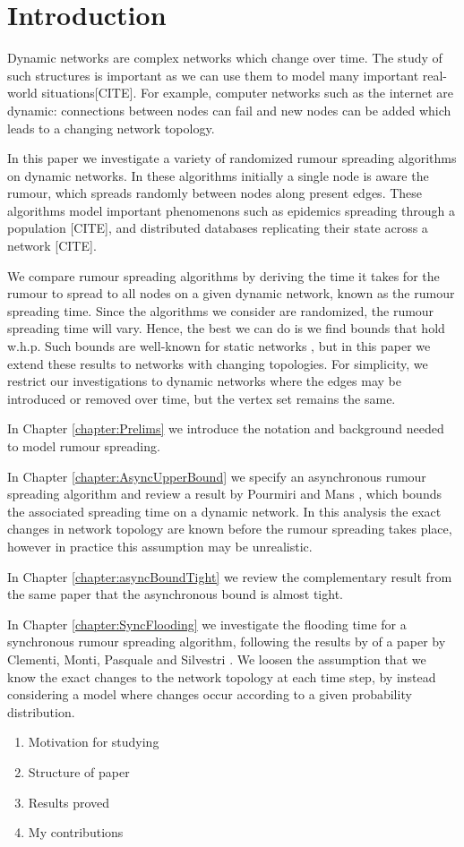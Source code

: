 \chapter{Introduction}

Dynamic networks are complex networks which change over time. The study of such structures is important as we can use them to model many important real-world situations[CITE]. For example, computer networks such as the internet are dynamic: connections between nodes can fail and new nodes can be added which leads to a changing network topology. 

In this paper we investigate a variety of randomized rumour spreading algorithms on dynamic networks. In these algorithms initially a single node is aware the rumour, which spreads randomly between nodes along present edges. These algorithms model important phenomenons such as epidemics spreading through a population [CITE], and distributed databases replicating their state across a network [CITE]. 

We compare rumour spreading algorithms by deriving the time it takes for the rumour to spread to all nodes on a given dynamic network, known as the rumour spreading time. Since the algorithms we consider are randomized, the rumour spreading time will vary. Hence, the best we can do is we find bounds that hold w.h.p. Such bounds are well-known for static networks \cite{complexNetworksRumourSpreading}, but in this paper we extend these results to networks with changing topologies. For simplicity, we restrict our investigations to dynamic networks where the edges may be introduced or removed over time, but the vertex set remains the same.

In Chapter \ref{chapter:Prelims} we introduce the notation and background needed to model rumour spreading.

In Chapter \ref{chapter:AsyncUpperBound} we specify an asynchronous rumour spreading algorithm and review a result by Pourmiri and Mans \cite{asyncPaper}, which bounds the associated spreading time on a dynamic network. In this analysis the exact changes in network topology are known before the rumour spreading takes place, however in practice this assumption may be unrealistic.

In Chapter \ref{chapter:asyncBoundTight} we review the complementary result from the same paper \cite{asyncPaper} that the asynchronous bound is almost tight.

In Chapter \ref{chapter:SyncFlooding} we investigate the flooding time for a synchronous rumour spreading algorithm, following the results by of a paper by Clementi, Monti, Pasquale and Silvestri \cite{syncPaper}. We loosen the assumption that we know the exact changes to the network topology at each time step, by instead considering a model where changes occur according to a given probability distribution.


\begin{enumerate}
	\item Motivation for studying
	\item Structure of paper
	\item Results proved
	\item My contributions
\end{enumerate}